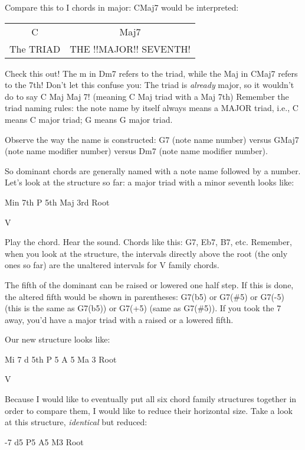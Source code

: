 Compare this to I chords in major: CMaj7 would be interpreted:

\begin{center}
\begin{tabular}{ c c }
  C           & Maj7\\
  The TRIAD   & THE !!MAJOR!! SEVENTH!\\
\end{tabular}
\end{center}

Check this out! The m in Dm7 refers to the triad, while the Maj in CMaj7
refers to the 7th! Don't let this confuse you: The triad is \emph{already} 
major, so it wouldn't do to say C Maj Maj 7! (meaning C Maj triad with
a Maj 7th) Remember the triad naming rules: the note name by itself always
means a MAJOR triad, i.e., C means C major triad; G means G major triad.

Observe the way the name is constructed: G7 (note name   number) versus
GMaj7 (note name  modifier  number) versus Dm7 (note name  modifier  number).

So dominant chords are generally named with a note name followed by a number.
Let's look at the structure so far: a major triad with a minor seventh looks
like:

        Min 7th
         P 5th
        Maj 3rd
         Root

          V

Play the chord. Hear the sound. Chords like this: G7, Eb7, B7, etc. Remember,
when you look at the structure, the intervals directly above the root (the
only ones so far) are the unaltered intervals for V family chords.

The fifth of the dominant can be raised or lowered one half step. If this is
done, the altered fifth would be shown in parentheses: G7(b5) or G7(\#5) or
G7(-5) (this is the same as G7(b5)) or G7(+5) (same as G7(\#5)). If you took
the 7 away, you'd have a major triad with a raised or a lowered fifth.

Our new structure looks like:

        Mi 7
 d 5th   P 5   A 5
        Ma 3
        Root

         V

Because I would like to eventually put all six chord family structures
together in order to compare them, I would like to reduce their horizontal
size. Take a look at this structure, \emph{identical} but reduced:

       -7
  d5   P5   A5
       M3
      Root


